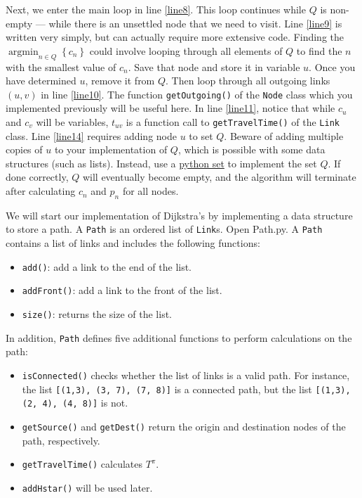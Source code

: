 \documentclass[11pt]{article}
\DeclareMathOperator*{\argmin}{\arg\min}
\begin{document}
Next, we enter the main loop in line \ref{line8}. This loop continues while $Q$ is non-empty --- while there is an unsettled node that we need to visit. Line \ref{line9} is written very simply, but can actually require more extensive code. Finding the $\argmin_{n\in Q} \left\{c_n\right\}$ could involve looping through all elements of $Q$ to find the $n$ with the smallest value of $c_n$. Save that node and store it in variable $u$. Once you have determined $u$, remove it from $Q$. Then loop through all outgoing links $(u,v)$ in line \ref{line10}. The function \texttt{getOutgoing()} of the \texttt{Node} class which you implemented previously will be useful here. In line \ref{line11}, notice that while $c_u$ and $c_v$ will be variables, $t_{uv}$ is a function call to \texttt{getTravelTime()} of the \texttt{Link} class. Line \ref{line14} requires adding node $u$ to set $Q$. Beware of adding multiple copies of $u$ to your implementation of $Q$, which is possible with some data structures (such as lists). Instead, use a \href{https://www.w3schools.com/python/python_sets.asp}{python set} to implement the set $Q$. If done correctly, $Q$ will eventually become empty, and the algorithm will terminate after calculating $c_n$ and $p_n$ for all nodes. 






We will start our implementation of Dijkstra's by implementing a data structure to store a path. 
A \texttt{Path} is an ordered list of \texttt{Link}s. Open Path.py. A \texttt{Path} contains a list of links and includes the following functions:
\begin{itemize}
	\item \texttt{add()}: add a link to the end of the list.
	\item \texttt{addFront()}: add a link to the front of the list.
	\item \texttt{size()}: returns the size of the list.
\end{itemize}

In addition, \texttt{Path} defines five additional functions to perform calculations on the path:
\begin{itemize}
	\item \texttt{isConnected()} checks whether the list of links is a valid path. For instance, the list \texttt{[(1,3), (3, 7), (7, 8)]} is a connected path, but the list \texttt{[(1,3), (2, 4), (4, 8)]} is not.
	\item  \texttt{getSource()} and \texttt{getDest()} return the origin and destination nodes of the path, respectively.
	\item \texttt{getTravelTime()} calculates $T^\pi$.
	\item \texttt{addHstar()} will be used later.
\end{itemize}
\end{document}
